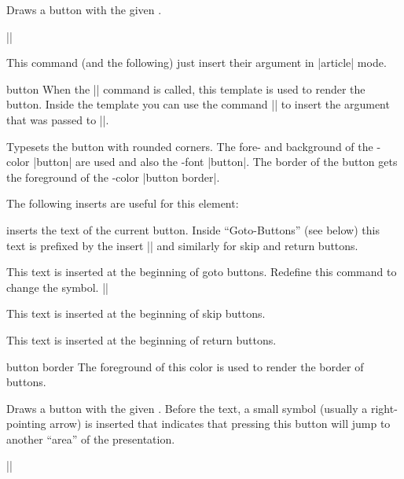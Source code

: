 \begin{command}{\beamerbutton{}}
  Draws a button with the given .

  \example
  |\hyperlink{somewhere}{}|

  \articlenote
  This command (and the following) just insert their argument in |article| mode.

  \begin{element}{button}\yes\yes\yes
    When the |\beamerbutton| command is called, this template is used to render the button. Inside the template you can use the command |\insertbuttontext| to insert the argument that was passed to |\beamerbutton|.
    \begin{templateoptions}
      Typesets the button with rounded corners. The fore- and background of the \beamer-color |button| are used and also the \beamer-font |button|. The border of the button gets the foreground of the \beamer-color |button border|.
    \end{templateoptions}
    The following inserts are useful for this element:
    \begin{itemize}
      \iteminsert{\insertbuttontext} inserts the text of the current button. Inside ``Goto-Buttons'' (see below) this text is prefixed by the insert |\insertgotosymbol| and similarly for skip and return buttons.

      \iteminsert{\insertgotosymbol} This text is inserted at the beginning of goto buttons. Redefine this command to change the symbol.
      \example
      |\renewcommand{\insertgotosymbol}{\somearrowcommand}|

      \iteminsert{\insertskipsymbol} This text is inserted at the beginning of skip buttons.

      \iteminsert{\insertreturnsymbol} This text is inserted at the beginning of return buttons.
    \end{itemize}
  \end{element}

  \begin{element}{button border}\no\yes\no
    The foreground of this color is used to render the border of buttons.
  \end{element}
\end{command}

\begin{command}{\beamergotobutton{}}
  Draws a button with the given . Before the text, a small symbol (usually a right-pointing arrow) is inserted that indicates that pressing this button will jump to another ``area'' of the presentation.

  \example
  |\hyperlink{detour}{}|
\end{command}

